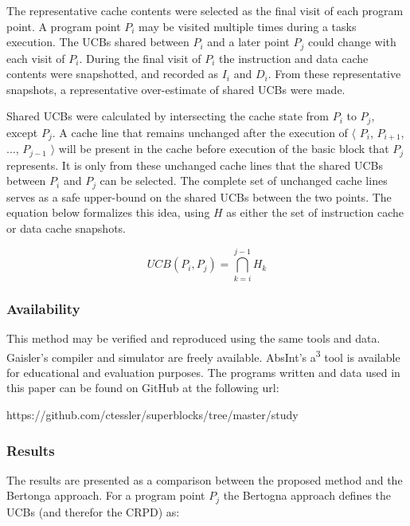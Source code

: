 The representative cache contents were selected as the final visit of
each program point. A program point ${P_i}$ may be visited multiple
times during a tasks execution. The UCBs shared between ${P_i}$ and a
later point ${P_j}$ could change with each visit of ${P_i}$. During
the final visit of ${P_i}$ the instruction and data cache contents
were snapshotted, and recorded as ${I_i}$ and ${D_i}$. From these
representative snapshots, a representative over-estimate of shared
UCBs were made. 

Shared UCBs were calculated by intersecting the cache state from ${P_i}$
to ${P_j}$, except ${P_j}$. A cache line that remains unchanged after
the execution of ${\langle}$ ${P_i}$, ${P_{i+1}}$, ..., ${P_{j-1}}$
${\rangle}$ will be
present in the cache before execution of the basic block that ${P_j}$
represents. It is only from these unchanged cache lines that the shared UCBs
between ${P_i}$ and ${P_j}$ can be selected. The complete set of
unchanged cache lines serves as a safe upper-bound on the shared UCBs
between the two points. The equation below formalizes this idea, using
${H}$ as either the set of instruction cache or data cache snapshots.

\begin{center}
  \begin{equation*}
    UCB(P_i, P_j) = \bigcap_{k=i}^{j-1} H_k
  \end{equation*}
\end{center}

\subsubsection{Availability}

This method may be verified and reproduced using the same tools and
data. Gaisler's compiler and simulator are freely available. AbsInt's
a\textsuperscript{3} tool is available for educational and evaluation
purposes. The programs written and data used in this paper can be
found on GitHub at the following url:

\begin{center}
https://github.com/ctessler/superblocks/tree/master/study
\end{center}


\subsubsection{Results}

The results are presented as a comparison between the proposed
method and the Bertonga approach. For a program point ${P_j}$ the 
Bertogna \cite{bertogna:11} approach defines the UCBs (and therefor the CRPD) as:

